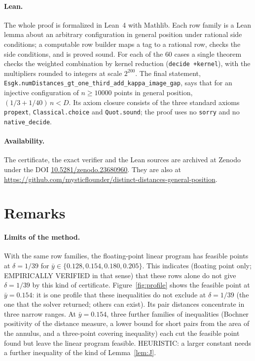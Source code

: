 \documentclass[11pt]{article}
\newcommand{\ybar}{\bar{y}}
\theoremstyle{remark}
\begin{document}
\paragraph{Lean.} The whole proof is formalized in Lean~4 with Mathlib. Each
row family is a Lean lemma about an arbitrary configuration in general
position under rational side conditions; a computable row builder maps a
tag to a rational row, checks the side conditions, and is proved sound. For
each of the $60$ cases a single theorem checks the weighted combination by
kernel reduction (\texttt{decide +kernel}), with the multipliers rounded
to integers at scale $2^{200}$. The final statement,
\texttt{Esgk.numDistances\_gt\_one\_third\_add\_kappa\_image\_gap}, says
that for an injective configuration of $n \ge 10000$ points in general
position, $(1/3 + 1/40)\,n < D$. Its axiom closure consists of the three standard
axioms \texttt{propext}, \texttt{Classical.choice} and \texttt{Quot.sound};
the proof uses no \texttt{sorry} and no \texttt{native\_decide}.

\paragraph{Availability.} The certificate, the exact verifier and the Lean
sources are archived at Zenodo under the DOI
\href{https://doi.org/10.5281/zenodo.23680960}{10.5281/zenodo.23680960}.
They are also at
\url{https://github.com/mysticflounder/distinct-distances-general-position}.

\section{Remarks}\label{sec:remarks}

\paragraph{Limits of the method.} With the same row families, the
floating-point linear program has feasible points at $\delta = 1/39$ for
$\ybar \in \{0.128, 0.154, 0.180, 0.205\}$. This indicates (floating point
only; EMPIRICALLY VERIFIED in that sense) that these rows alone do not give
$\delta = 1/39$ by this kind of certificate. Figure~\ref{fig:profile} shows
the feasible point at $\ybar = 0.154$: it is one profile that these inequalities do not exclude at $\delta = 1/39$ (the one that the solver returned; others can exist). Its pair distances concentrate in three narrow
ranges. At $\ybar = 0.154$, three further families of inequalities
(Bochner positivity of the distance measure, a lower bound for short pairs
from the area of the annulus, and a three-point covering inequality) each
cut the feasible point found but leave the linear program feasible.
HEURISTIC: a larger constant needs a further inequality of the kind of
Lemma~\ref{lem:J}.
\end{document}
